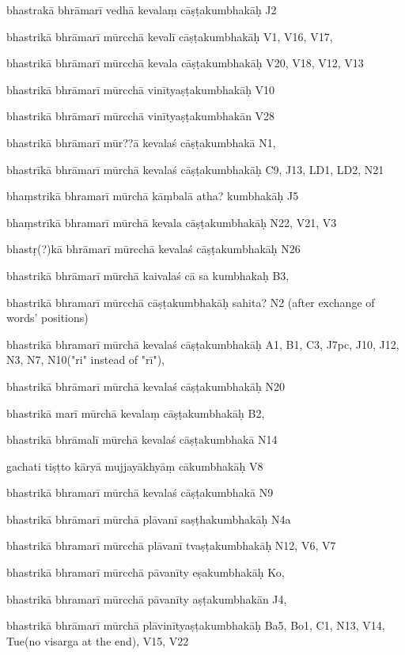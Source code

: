 \begin{ekdosis}
\begin{marma}[hp01_055]
\begin{marma}[hp02_009]
\begin{marma}[hp02_011]
      \begin{marma}[hp02_44cd]
      \item[bhastrakā bhrāmarī vedhā kevalaṃ cāṣṭakumbhakāḥ] J2
      \item[bhastrikā bhrāmarī mūrcchā kevalī cāṣṭakumbhakāḥ] V1, V16, V17, 
      \item[bhastrikā bhrāmarī mūrcchā kevala cāṣṭakumbhakāḥ] V20, V18, V12, V13
      \item[bhastrikā bhrāmarī mūrcchā vinītyaṣṭakumbhakāḥ] V10
      \item[bhastrikā bhrāmarī mūrcchā vinītyaṣṭakumbhakān] V28
      \item[bhastrikā bhrāmarī mūr??ā kevalaś cāṣṭakumbhakā] N1,
      \item[bhastrīkā bhrāmarī mūrchā kevalaś cāṣṭakumbhakāḥ] C9, J13, LD1, LD2, N21
      \item[bhaṃstrikā bhramarī mūrchā kāṃbalā atha? kumbhakāḥ] J5
      \item[bhaṃstrīkā bhramarī mūrchā kevala cāṣṭakumbhakāḥ] N22, V21, V3
      \item[bhastṛ(?)kā bhrāmarī mūrcchā kevalaś cāṣṭakumbhakāḥ] N26
      \item[bhastrikā bhrāmarī mūrchā kaivalaś cā sa kumbhakaḥ] B3,
      \item[bhastrikā bhramarī mūrcchā cāṣṭakumbhakāḥ sahita?] N2 (after exchange of words' positions)
      \item[bhastrikā bhramarī mūrchā kevalaś cāṣṭakumbhakāḥ] A1, B1, C3, J7pc, J10, J12, N3, N7, N10("ri" instead of "rī"),
      \item[bhastrikā bhrāmarī mūrchā kevalaś cāṣṭakumbhakāḥ] N20
      \item[bhastrikā marī mūrchā kevalaṃ cāṣṭakumbhakāḥ] B2,
      \item[bhastrikā bhrāmalī mūrchā kevalaś cāṣṭakumbhakā] N14
      \item[gachati tiṣṭto kāryā mujjayākhyāṃ cākumbhakāḥ] V8
      \item[bhastrikā bhramarī mūrchā kevalaś cāṣṭakumbhakā] N9
      \item[bhastrikā bhrāmarī mūrchā plāvanī saṣṭhakumbhakāḥ] N4a
      \item[bhastrikā bhramarī mūrcchā plāvanī tvaṣṭakumbhakāḥ] N12, V6, V7
      \item[bhastrikā bhramarī mūrcchā pāvanīty eṣakumbhakāḥ] Ko,
      \item[bhastrikā bhramarī mūrcchā pāvanīty aṣṭakumbhakān] J4,
      \item[bhastrikā bhrāmarī mūrchā plāvinītyaṣṭakumbhakāḥ] Ba5, Bo1, C1, N13, V14, Tue(no visarga at the end), V15, V22

\end{marma}
\end{marma}
\end{marma}
\end{marma}
\end{ekdosis}

